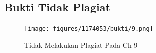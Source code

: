 \subsection{Bukti Tidak Plagiat}
\begin{figure}[H]
    \texttt{[image: figures/1174053/bukti/9.png]}
    \centering
    \caption{Tidak Melakukan Plagiat Pada Ch 9}
\end{figure}